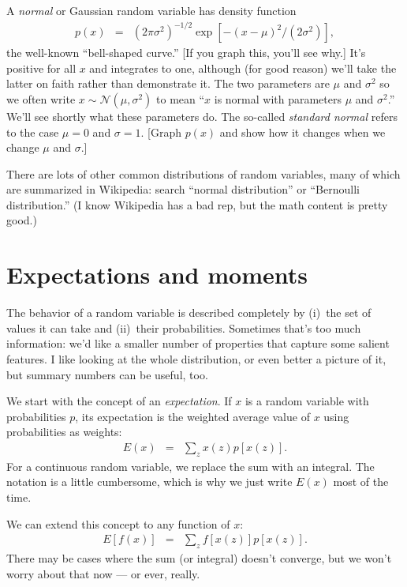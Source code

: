 \documentclass[11pt]{article}
\begin{document}
\begin{itemize}
A {\it normal\/} or Gaussian random variable has density
function
\begin{eqnarray*}
    p(x) &=& (2 \pi \sigma^2)^{-1/2} \exp[-(x-\mu)^2/(2\sigma^2)] ,
\end{eqnarray*}
the well-known ``bell-shaped curve.''
[If you graph this, you'll see why.]
It's positive for all $x$ and integrates to one,
although (for good reason) we'll take the latter on faith rather than demonstrate it.
%
The two parameters are $\mu$ and $\sigma^2$ so we often
write $ x \sim \mathcal{N}(\mu, \sigma^2)$ to mean
``$x$ is normal with parameters $\mu$ and $\sigma^2$.''
We'll see shortly what these parameters do.
%
The so-called {\it standard normal\/} refers to the case
$\mu = 0$ and $\sigma = 1$.
[Graph $p(x)$ and show how it changes when we change $\mu$ and $\sigma$.]
\end{itemize}

There are lots of other common distributions of random variables,
many of which are summarized in Wikipedia:
search ``normal distribution'' or ``Bernoulli distribution.''
(I know Wikipedia
has a bad rep, but the math content is pretty good.)


\section{Expectations and moments}

The behavior of a random variable is described completely
by (i)~the set of values it can take
and (ii)~their probabilities.
Sometimes that's too much information:  we'd like a smaller number
of properties that capture some salient features.
I like looking at the whole distribution,
or even better a picture of it,
but summary numbers can be useful, too.

We start with the concept of an {\it expectation\/}.
If $x$ is a random variable with probabilities $p$,
its expectation is the weighted average value of $x$
using probabilities as weights:
\begin{eqnarray*}
    E (x) &=& \sum_z x(z) p[x(z)]  .
\end{eqnarray*}
For a continuous random variable,
we replace the sum with an integral.
The notation is a little cumbersome, which is why
we just write $E(x)$ most of the time.

We can extend this concept to any function of $x$:
\begin{eqnarray}
    E [f(x)] &=& \sum_z  f[x(z)] p[x(z)] .
    \label{eq:expectation}
\end{eqnarray}
There may be cases where the sum (or integral) doesn't converge,
but we won't worry about that now --- or ever, really.
\end{document}
